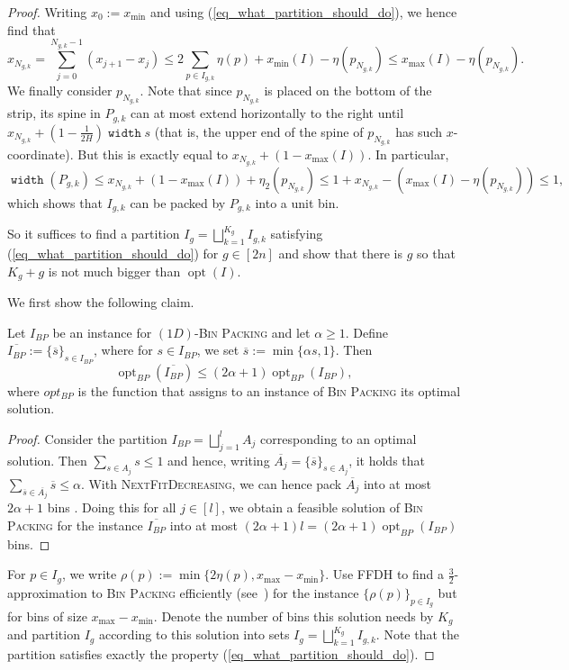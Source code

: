\documentclass[a4paper,UKenglish,cleveref, autoref, thm-restate]{lipics_v2021}
\DeclareMathOperator{\opt}{opt}
\DeclareMathOperator{\width}{\mathtt{width}}
\begin{document}
\begin{proof}
Writing $x_0 := x_{\min}$ and using (\ref{eq_what_partition_should_do}), we hence find that
\[
x_{N_{g,k}} = \sum_{j=0}^{N_{g,k}-1} (x_{j+1} - x_j) \leq 2 \sum_{p \in I_{g,k}} \eta(p) + x_{\min}(I) - \eta(p_{N_{g,k}})  \leq x_{\max}(I) - \eta(p_{N_{g,k}}).
\]
We finally consider $p_{N_{g,k}}$. Note that since $p_{N_{g,k}}$ is placed on the bottom of the strip, its spine in $P_{g,k}$ can at most extend horizontally to the right until $x_{N_{g,k}} + (1-\frac{1}{2H})\width{s}$ (that is, the upper end of the spine of $p_{N_{g,k}}$ has such $x$-coordinate). But this is exactly equal to $x_{N_{g,k}} + (1-x_{\max}(I))$. In particular,
\[
\width(P_{g,k}) \leq x_{N_{g,k}} + (1-x_{\max}(I)) + \eta_2(p_{N_{g,k}}) \leq 1 + x_{N_{g,k}} -(x_{\max}(I) - \eta(p_{N_{g,k}})) \leq 1,
\]
which shows that $I_{g,k}$ can be packed by $P_{g,k}$ into a unit bin.

So it suffices to find a partition $I_g = \bigsqcup_{k=1}^{K_g} I_{g,k}$ satisfying (\ref{eq_what_partition_should_do}) for $g \in [2n]$ and show that there is $g$ so that $K_g + g$ is not much bigger than $\opt(I)$. 

We first show the following claim.

\begin{claim}
Let $I_{BP}$ be an instance for $(1D)$-\textsc{Bin Packing} and let $\alpha \geq 1$. Define $\overline{I_{BP}} := \{\overline{s}\}_{s \in I_{BP}}$, where for $s \in I_{BP}$,  we set $\overline{s}:=\min\{\alpha s,1\}$. Then
\[
\opt_{BP}(\overline{I_{BP}}) \leq (2 \alpha+1) \opt_{BP}(I_{BP}),
\]
where $opt_{BP}$ is the function that assigns to an instance of \textsc{Bin Packing} its optimal solution.
\end{claim}
\begin{proof}
Consider the partition $I_{BP}=\bigsqcup_{j=1}^l A_j$ corresponding to an optimal solution. Then $\sum_{s \in A_j} s \leq 1$ and hence, writing $\overline{A_j} = \{\overline{s}\}_{s \in A_j}$, it holds that $\sum_{\overline{s} \in \overline{A_j}} \overline{s} \leq \alpha$. With \textsc{NextFitDecreasing}, we can hence pack $\overline{A_j}$ into at most $2 \alpha + 1$ bins . Doing this for all $j \in [l]$, we obtain a feasible solution of \textsc{Bin Packing} for the instance $\overline{I_{BP}}$ into at most $(2\alpha + 1) l = (2 \alpha + 1) \opt_{BP}(I_{BP})$ bins.
\end{proof}

For $p \in I_g$, we write $\rho(p):=\min \{2\eta(p),x_{\max}-x_{\min}\}$. Use FFDH to find a $\frac{3}{2}$-approximation to \textsc{Bin Packing} efficiently (see~\cite{SimchiLevi1994NewWR}) for the instance $\{\rho(p)\}_{p \in I_g}$ but for bins of size $x_{\max}-x_{\min}$. Denote the number of bins this solution needs by $K_g$ and partition $I_g$ according to this solution into sets $I_g = \bigsqcup_{k=1}^{K_g} I_{g,k}$. Note that the partition satisfies exactly the property (\ref{eq_what_partition_should_do}).


\end{proof}
\end{document}
